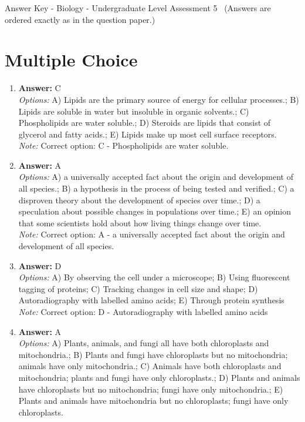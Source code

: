 \documentclass[12pt]{article}
\begin{document}
\begin{center}
Answer Key - Biology - Undergraduate Level Assessment 5 \
\small (Answers are ordered exactly as in the question paper.)
\end{center}

\section*{Multiple Choice}
\begin{enumerate}[label=\arabic*.]
\item \textbf{Answer:} C
\\ \textit{Options:} A) Lipids are the primary source of energy for cellular processes.; B) Lipids are soluble in water but insoluble in organic solvents.; C) Phospholipids are water soluble.; D) Steroids are lipids that consist of glycerol and fatty acids.; E) Lipids make up most cell surface receptors.
\\ \textit{Note:} Correct option: C - Phospholipids are water soluble.
\item \textbf{Answer:} A
\\ \textit{Options:} A) a universally accepted fact about the origin and development of all species.; B) a hypothesis in the process of being tested and verified.; C) a disproven theory about the development of species over time.; D) a speculation about possible changes in populations over time.; E) an opinion that some scientists hold about how living things change over time.
\\ \textit{Note:} Correct option: A - a universally accepted fact about the origin and development of all species.
\item \textbf{Answer:} D
\\ \textit{Options:} A) By observing the cell under a microscope; B) Using fluorescent tagging of proteins; C) Tracking changes in cell size and shape; D) Autoradiography with labelled amino acids; E) Through protein synthesis
\\ \textit{Note:} Correct option: D - Autoradiography with labelled amino acids
\item \textbf{Answer:} A
\\ \textit{Options:} A) Plants, animals, and fungi all have both chloroplasts and mitochondria.; B) Plants and fungi have chloroplasts but no mitochondria; animals have only mitochondria.; C) Animals have both chloroplasts and mitochondria; plants and fungi have only chloroplasts.; D) Plants and animals have chloroplasts but no mitochondria; fungi have only mitochondria.; E) Plants and animals have mitochondria but no chloroplasts; fungi have only chloroplasts.

\end{enumerate}
\end{document}

